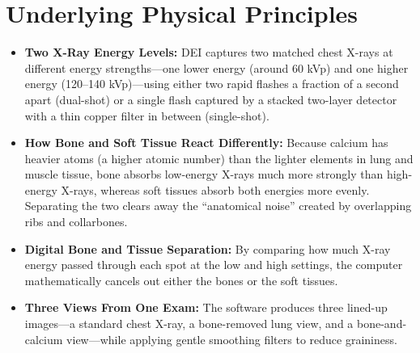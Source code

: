 \section{Underlying Physical Principles}
\begin{itemize}
    \item \textbf{Two X-Ray Energy Levels:} DEI captures two matched chest X-rays at different energy strengths---one lower energy (around 60 kVp) and one higher energy (120--140 kVp)---using either two rapid flashes a fraction of a second apart (dual-shot) or a single flash captured by a stacked two-layer detector with a thin copper filter in between (single-shot).
    \item \textbf{How Bone and Soft Tissue React Differently:} Because calcium has heavier atoms (a higher atomic number) than the lighter elements in lung and muscle tissue, bone absorbs low-energy X-rays much more strongly than high-energy X-rays, whereas soft tissues absorb both energies more evenly. Separating the two clears away the ``anatomical noise'' created by overlapping ribs and collarbones.
    \item \textbf{Digital Bone and Tissue Separation:} By comparing how much X-ray energy passed through each spot at the low and high settings, the computer mathematically cancels out either the bones or the soft tissues.
    \item \textbf{Three Views From One Exam:} The software produces three lined-up images---a standard chest X-ray, a bone-removed lung view, and a bone-and-calcium view---while applying gentle smoothing filters to reduce graininess.
\end{itemize}

